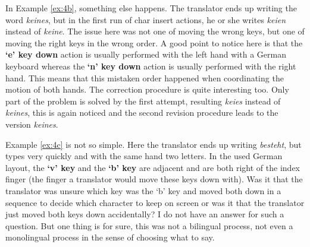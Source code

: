 In Example \ref{ex:4b}, something else happens. The translator ends up writing the word \emph{keines}, but in the first run of char insert actions, he or she writes \emph{keien} instead of \emph{keine}. The issue here was not one of moving the wrong keys, but one of moving the right keys in the wrong order. A good point to notice here is that the \textbf{`e' key down} action is usually performed with the left hand with a German keyboard whereas the \textbf{`n' key down} action is usually performed with the right hand. This means that this mistaken order happened when coordinating the motion of both hands. The correction procedure is quite interesting too. Only part of the problem is solved by the first attempt, resulting \emph{keies} instead of \emph{keines}, this is again noticed and the second revision procedure leads to the version \emph{keines}.

Example \ref{ex:4c} is not so simple. Here the translator ends up writing \emph{besteht}, but types very quickly and with the same hand two letters. In the used German layout, the \textbf{`v' key} and the \textbf{`b' key} are adjacent and are both right of the index finger (the finger a translator would move these keys down with). Was it that the translator was unsure which key was the `b' key and moved both down in a sequence to decide which character to keep on screen or was it that the translator just moved both keys down accidentally? I do not have an answer for such a question. But one thing is for sure, this was not a bilingual process, not even a monolingual process in the sense of choosing what to say.

